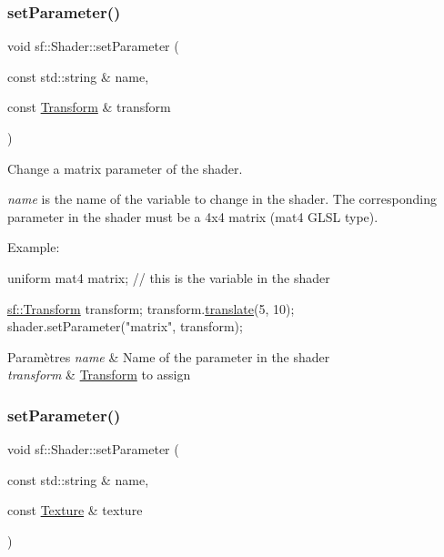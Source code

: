 \subsubsection{\texorpdfstring{set\+Parameter()}{setParameter()}\hspace{0.1cm}{\footnotesize\ttfamily [8/10]}}
{\footnotesize\ttfamily void sf\+::\+Shader\+::set\+Parameter (\begin{DoxyParamCaption}\item[{const std\+::string \&}]{name,  }\item[{const \hyperlink{classsf_1_1Transform}{Transform} \&}]{transform }\end{DoxyParamCaption})}



Change a matrix parameter of the shader. 

{\itshape name} is the name of the variable to change in the shader. The corresponding parameter in the shader must be a 4x4 matrix (mat4 G\+L\+SL type).

Example\+: 
\begin{DoxyCode}
uniform mat4 matrix; \textcolor{comment}{// this is the variable in the shader}
\end{DoxyCode}
 
\begin{DoxyCode}
\hyperlink{classsf_1_1Transform}{sf::Transform} transform;
transform.\hyperlink{classsf_1_1Transform_ab54f6c8070cc05e2afcb3145fbf4395a}{translate}(5, 10);
shader.setParameter(\textcolor{stringliteral}{"matrix"}, transform);
\end{DoxyCode}



\begin{DoxyParams}{Paramètres}
{\em name} & Name of the parameter in the shader \\
\hline
{\em transform} & \hyperlink{classsf_1_1Transform}{Transform} to assign \\
\hline
\end{DoxyParams}
\mbox{\label{classsf_1_1Shader_a7f58ab5c0a1084f238dfcec86602daa1}} 
\subsubsection{\texorpdfstring{set\+Parameter()}{setParameter()}\hspace{0.1cm}{\footnotesize\ttfamily [9/10]}}
{\footnotesize\ttfamily void sf\+::\+Shader\+::set\+Parameter (\begin{DoxyParamCaption}\item[{const std\+::string \&}]{name,  }\item[{const \hyperlink{classsf_1_1Texture}{Texture} \&}]{texture }\end{DoxyParamCaption})}



